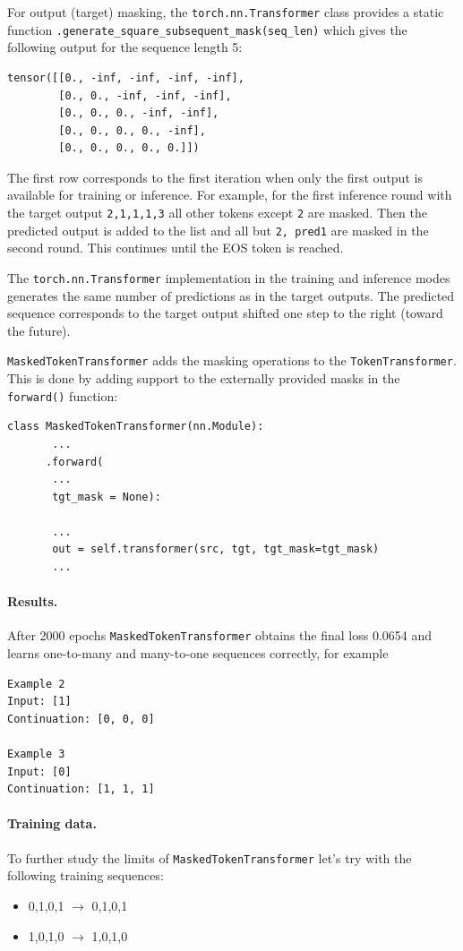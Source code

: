 \documentclass[final]{article}
\begin{document}
For output (target) masking, the \texttt{torch.nn.Transformer} class provides a static function \texttt{.generate\_square\_subsequent\_mask(seq\_len)} which gives the following output for the sequence length 5:
\begin{verbatim}
tensor([[0., -inf, -inf, -inf, -inf],
        [0., 0., -inf, -inf, -inf],
        [0., 0., 0., -inf, -inf],
        [0., 0., 0., 0., -inf],
        [0., 0., 0., 0., 0.]])
\end{verbatim}
The first row corresponds to the first iteration when only the first output is available for training or inference. For example, for the first inference round with the target output \texttt{2,1,1,1,3} all other tokens except \texttt{2} are masked. Then the predicted output is added to the list and all but \texttt{2, pred1} are masked in the second round. This continues until the EOS token is reached.

The \texttt{torch.nn.Transformer} implementation in the training and inference modes generates the same number of predictions as in the target outputs. The predicted sequence corresponds to the target output shifted one step to the right (toward the future).

\texttt{MaskedTokenTransformer} adds the masking operations to the \texttt{TokenTransformer}. This is done by adding support to the externally provided masks in the \texttt{forward()} function:
\begin{lstlisting}
class MaskedTokenTransformer(nn.Module):
       ...
      .forward(
       ...
       tgt_mask = None):

       ...
       out = self.transformer(src, tgt, tgt_mask=tgt_mask)
       ...
\end{lstlisting}


\paragraph{Results.}
After 2000 epochs \texttt{MaskedTokenTransformer} obtains the final loss 0.0654 and learns one-to-many and many-to-one sequences correctly, for example
\begin{verbatim}
Example 2
Input: [1]
Continuation: [0, 0, 0]

Example 3
Input: [0]
Continuation: [1, 1, 1]
\end{verbatim}


\paragraph{Training data.}
To further study the limits of \texttt{MaskedTokenTransformer} let's try with the following training sequences:
\begin{itemize}
  \item 0,1,0,1 $\rightarrow$ 0,1,0,1
  \item 1,0,1,0 $\rightarrow$ 1,0,1,0
\end{itemize}
\end{document}
